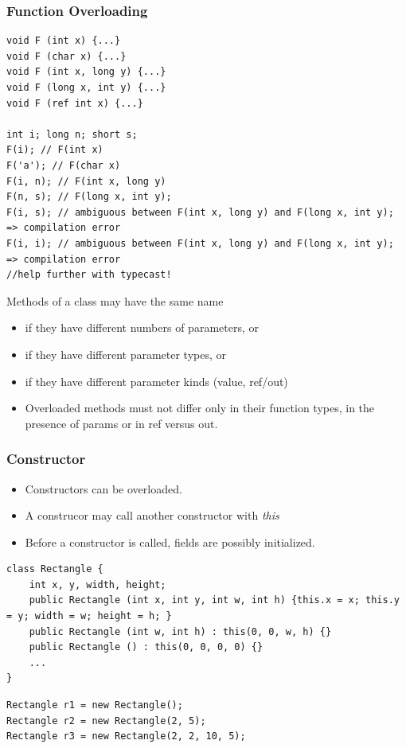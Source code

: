 \subsubsection{Function Overloading}
\begin{multicols}{2}
\begin{lstlisting}
void F (int x) {...}
void F (char x) {...}
void F (int x, long y) {...}
void F (long x, int y) {...}
void F (ref int x) {...}

int i; long n; short s;
F(i); // F(int x)
F('a'); // F(char x)
F(i, n); // F(int x, long y)
F(n, s); // F(long x, int y);
F(i, s); // ambiguous between F(int x, long y) and F(long x, int y); => compilation error
F(i, i); // ambiguous between F(int x, long y) and F(long x, int y); => compilation error
//help further with typecast!
\end{lstlisting}
	\columnbreak
	Methods of a class may have the same name
	\begin{itemize}
		\item if they have different numbers of parameters, or
		\item if they have different parameter types, or
		\item if they have different parameter kinds (value, ref/out)
		\item Overloaded methods must not differ only in their function types, in the presence of params
		      or in ref versus out.
	\end{itemize}
\end{multicols}

\subsubsection{Constructor}
\begin{itemize}
	\item Constructors can be overloaded.
	\item A construcor may call another constructor with \textit{this}
	\item Before a constructor is called, fields are possibly initialized.
\end{itemize}

\begin{multicols}{2}
\begin{lstlisting}
class Rectangle {
	int x, y, width, height;
	public Rectangle (int x, int y, int w, int h) {this.x = x; this.y = y; width = w; height = h; }
	public Rectangle (int w, int h) : this(0, 0, w, h) {}
	public Rectangle () : this(0, 0, 0, 0) {}
	...
}
\end{lstlisting}
\columnbreak
\begin{lstlisting}
Rectangle r1 = new Rectangle();
Rectangle r2 = new Rectangle(2, 5);
Rectangle r3 = new Rectangle(2, 2, 10, 5);
\end{lstlisting}
\end{multicols}

